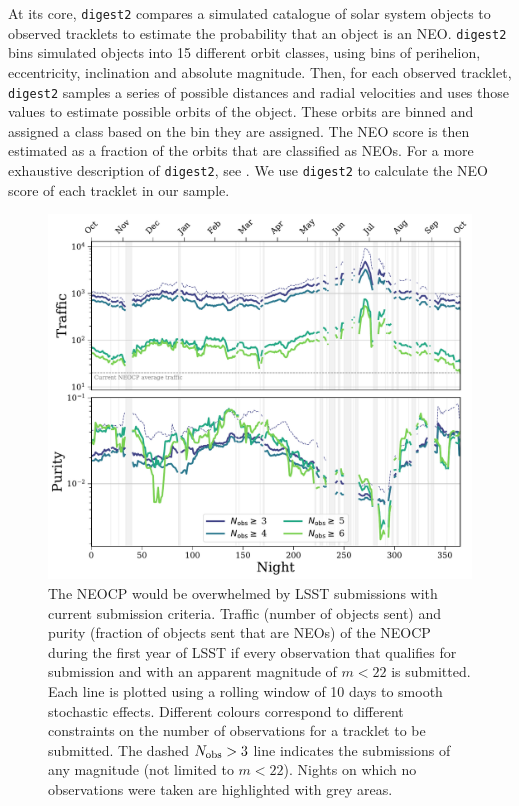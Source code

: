 \documentclass[twocolumn]{aastex631}
\newcommand{\dig}{\texttt{digest2}}
\begin{document}
At its core, \dig{} compares a simulated catalogue of solar system objects to observed tracklets to estimate the probability that an object is an NEO. \dig{} bins simulated objects into 15 different orbit classes, using bins of perihelion, eccentricity, inclination and absolute magnitude. Then, for each observed tracklet, \dig{} samples a series of possible distances and radial velocities and uses those values to estimate possible orbits of the object. These orbits are binned and assigned a class based on the bin they are assigned. The NEO score is then estimated as a fraction of the orbits that are classified as NEOs. For a more exhaustive description of \dig{}, see \citet{Keys+2019}. We use \dig{} to calculate the NEO score of each tracklet in our sample. 
\begin{figure}[htb]
    \centering
    \includegraphics[width=\textwidth]{traffic_purity.pdf}
    \caption{The NEOCP would be overwhelmed by LSST submissions with current submission criteria. Traffic (number of objects sent) and purity (fraction of objects sent that are NEOs) of the NEOCP during the first year of LSST if every observation that qualifies for submission and with an apparent magnitude of $m < 22$ is submitted. Each line is plotted using a rolling window of 10 days to smooth stochastic effects. Different colours correspond to different constraints on the number of observations for a tracklet to be submitted. The dashed $N_{\rm obs} > 3$ line indicates the submissions of any magnitude (not limited to $m < 22$). Nights on which no observations were taken are highlighted with grey areas.}
    \label{fig:neocp_traffic}
\end{figure}
\end{document}

